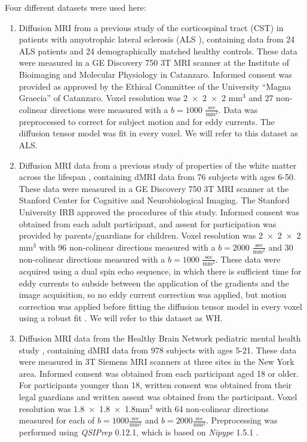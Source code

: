 \documentclass[10pt,letterpaper]{article}
\begin{document}
Four different datasets were used here:

\begin{enumerate}

\item Diffusion MRI from a previous study of the corticospinal
tract (CST) in patients with amyotrophic lateral sclerosis
(ALS \cite{sarica2017corticospinal}), containing data from 24 ALS
patients and 24 demographically matched healthy controls. These data
were measured in a GE Discovery 750 3T MRI scanner at the Institute
of Bioimaging and Molecular Physiology in Catanzaro. Informed consent
was provided as approved by the Ethical Committee of the University
``Magna Graecia'' of Catanzaro. Voxel resolution was \num{2x2x2}
$\text{mm}^3$ and 27 non-colinear directions were measured with a
$b=1000$ $\frac{\text{sec}}{\text{mm}^2}$. Data was preprocessed to
correct for subject motion and for eddy currents. The diffusion tensor
model \cite{basser1994mr} was fit in every voxel.
We will refer to this dataset as ALS.

\item Diffusion MRI data from a previous study of properties of
the white matter across the lifespan \cite{yeatman2014lifespan},
containing dMRI data from 76 subjects with ages 6-50. These data were
measured in a GE Discovery 750 3T MRI scanner at the Stanford Center
for Cognitive and Neurobiological Imaging. The Stanford University
IRB approved the procedures of this study. Informed consent was
obtained from each adult participant, and assent for participation
was provided by parents/guardians for children. Voxel resolution was
\num{2x2x2}$\text{mm}^3$ with 96 non-colinear directions measured with a
$b=2000$ $\frac{\text{sec}}{\text{mm}^2}$ and 30 non-colinear directions
measured with a $b=1000$ $\frac{\text{sec}}{\text{mm}^2}$. These data
were acquired using a dual spin echo sequence, in which there is
sufficient time for eddy currents to subside between the application of
the gradients and the image acquisition, so no eddy current correction
was applied, but motion correction was applied before fitting the
diffusion tensor model \cite{basser1994mr} in every voxel using a robust
fit \cite{chang2005restore}. We will refer to this dataset as WH.

\item Diffusion MRI data from the Healthy Brain Network pediatric mental
health study \cite{alexander2017open}, containing dMRI data from 978 subjects
with ages 5-21. These data were measured in 3T Siemens MRI scanners at three
sites in the New York area. Informed consent was obtained from each
participant aged 18 or older. For participants younger than 18, written
consent was obtained from their legal guardians and written assent was
obtained from the participant. Voxel resolution was
\num{1.8x1.8x1.8}$\text{mm}^3$ with 64 non-colinear directions measured for
each of $b=1000 \frac{\text{sec}}{\text{mm}^2}$ and $b=2000
\frac{\text{sec}}{\text{mm}^2}$.
Preprocessing was performed using \emph{QSIPrep} 0.12.1, which is based on
\emph{Nipype} 1.5.1 \cite[RRID:SCR\_002502]{nipype1,nipype2}.


\end{enumerate}
\end{document}
